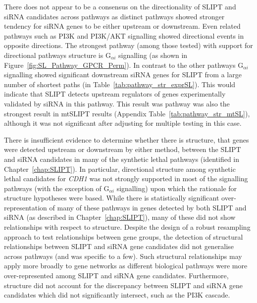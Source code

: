 There does not appear to be a consensus on the directionality of \gls{SLIPT} and \gls{siRNA} candidates across \glspl{pathway} as distinct \glspl{pathway} showed stronger tendency for \gls{siRNA} genes to be either upstream or downstream. Even related \glspl{pathway} such as \gls{PI3K} and PI3K/AKT signalling showed directional events in opposite directions. The strongest \gls{pathway} (among those tested) with support for directional \glspl{pathway} structure is G$_{\alpha i}$ signalling (as shown in Figure~\ref{fig:SL_Pathway_GPCR_Perm}). In contrast to the other \glspl{pathway} G$_{\alpha i}$ signalling showed significant downstream \gls{siRNA} genes for \gls{SLIPT} from a large number of \glspl{shortest path} (in Table~\ref{tab:pathway_str_exprSL}). This would indicate that \gls{SLIPT} detects upstream regulators of genes experimentally validated by \gls{siRNA} in this \gls{pathway}. This result was \gls{pathway} was also the strongest result in \acrshort{mtSLIPT} results (Appendix Table~\ref{tab:pathway_str_mtSL}), although it was not significant after adjusting for multiple testing in this case. %


There is insufficient evidence to determine whether there is  structure, that genes were detected upstream or downstream by either method, between the \gls{SLIPT} and \gls{siRNA} candidates in many of the \gls{synthetic lethal} \glspl{pathway} (identified in Chapter~\ref{chap:SLIPT}). In particular, directional structure among \gls{synthetic lethal} candidates for \textit{CDH1} was not strongly supported in most of the signalling \glspl{pathway} (with the exception of G$_{\alpha i}$ signalling) upon which the rationale for  structure hypotheses were based. While there is statistically significant over-representation of many of these \glspl{pathway} in genes detected by both \gls{SLIPT} and \gls{siRNA} (as described in Chapter~\ref{chap:SLIPT}), many of these did not show relationships with respect to  structure. Despite the design of a robust resampling approach to test relationships between gene groups, the detection of structural relationships between \gls{SLIPT} and \gls{siRNA} gene candidates did not generalise across \glspl{pathway} (and was specific to a few). Such structural relationships may apply more broadly to gene networks as different biological \glspl{pathway} were more over-represented among \gls{SLIPT} and \gls{siRNA} gene candidates. Furthermore,  structure did not account for the discrepancy between \gls{SLIPT} and \gls{siRNA} gene candidates which did not significantly intersect, such as the \gls{PI3K} cascade. 

